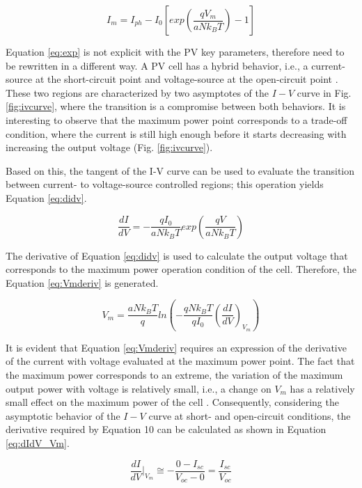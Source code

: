 \documentclass[journal]{IEEEtran}
\begin{document}
\begin{equation}
\label{eq:Im}
I_{m} =I_{ph}-I_{0}\left[ exp \left( \dfrac{qV_{m}}{aNk_{B}T} \right) -1 \right] 
\end{equation}


Equation \ref{eq:exp} is not explicit with the PV key parameters, therefore need to be rewritten in a different way. A PV cell has a hybrid behavior, i.e., a current-source at the short-circuit point and voltage-source at the open-circuit point \cite{Saloux}. These two regions are characterized by two asymptotes of the $ I-V $ curve in Fig. \ref{fig:ivcurve}, where the transition is a compromise between both behaviors. It is interesting to observe that the maximum power point corresponds to a trade-off condition, where the current is still high enough before it starts decreasing with increasing the output voltage (Fig. \ref{fig:ivcurve}).

Based on this, the tangent of the I-V curve can be used to evaluate the transition between current- to voltage-source controlled regions; this operation yields Equation \ref{eq:didv}.

\begin{equation}
\label{eq:didv}
\dfrac{dI}{dV}=-\dfrac{qI_{0}}{aNk_{B}T}exp \left( \dfrac{qV}{aNk_{B}T}  \right) 
\end{equation}

The derivative of Equation \ref{eq:didv} is used to calculate the output voltage that corresponds to the maximum power operation condition of the cell. Therefore, the Equation \ref{eq:Vmderiv} is generated.

\begin{equation}
\label{eq:Vmderiv}
V_{m}=\dfrac{aNk_{B}T}{q} ln \left( -\dfrac{qNk_{B}T}{qI_{0}} \left( \dfrac{dI}{dV}  \right)_{V_{m}}   \right) 
\end{equation}

It is evident that Equation \ref{eq:Vmderiv} requires an expression of the derivative of the current with voltage evaluated at the maximum power point. The fact that the maximum power corresponds to an extreme, the variation of the maximum output power with voltage is relatively small, i.e., a change on $ V_{m} $ has a relatively small effect on the maximum power of the cell \cite{Saloux}. Consequently, considering the asymptotic behavior of the $I-V$ curve at short- and open-circuit conditions, the derivative required by Equation 10 can be calculated as shown in Equation \ref{eq:dIdV_Vm}.

\begin{equation}
\label{eq:dIdV_Vm}
\dfrac{dI}{dV}\vert_{V_{m}} \cong -\dfrac{0-I_{sc}}{V_{oc}-0}=\dfrac{I_{sc}}{V_{oc}}
\end{equation}
\end{document}
